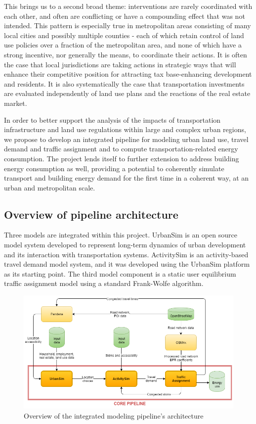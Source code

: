 This brings us to a second broad theme: interventions are rarely coordinated with each other, and often are conflicting or have a compounding effect that was not intended. This pattern is especially true in metropolitan areas consisting of many local cities and possibly multiple counties - each of which retain control of land use policies over a fraction of the metropolitan area, and none of which have a strong incentive, nor generally the means, to coordinate their actions. It is often the case that local jurisdictions are taking actions in strategic ways that will enhance their competitive position for attracting tax base-enhancing development and residents. It is also systematically the case that transportation investments are evaluated independently of land use plans and the reactions of the real estate market.

In order to better support the analysis of the impacts of transportation infrastructure and land use regulations within large and complex urban regions, we propose to develop an integrated pipeline for modeling urban land use, travel demand and traffic assignment and to compute transportation-related energy consumption. The project lends itself to further extension to address building energy consumption as well, providing a potential to coherently simulate transport and building energy demand for the first time in a coherent way, at an urban and metropolitan scale. 


\subsection{Overview of pipeline architecture}

Three models are integrated within this project. UrbanSim is an open source model system developed to represent long-term dynamics of urban development and its interaction with transportation systems. ActivitySim is an activity-based travel demand model system, and it was developed using the UrbanSim platform as its starting point. The third model component is a static user equilibrium traffic assignment model using a standard Frank-Wolfe algorithm.

\begin{figure}[htbp]
  \center
  \includegraphics[width=\textwidth]
  {graphics/diagram_pipeline.png}
  \caption{Overview of the integrated modeling pipeline's architecture}
  \label{fig:overview_pipeline_architecture}
\end{figure}

